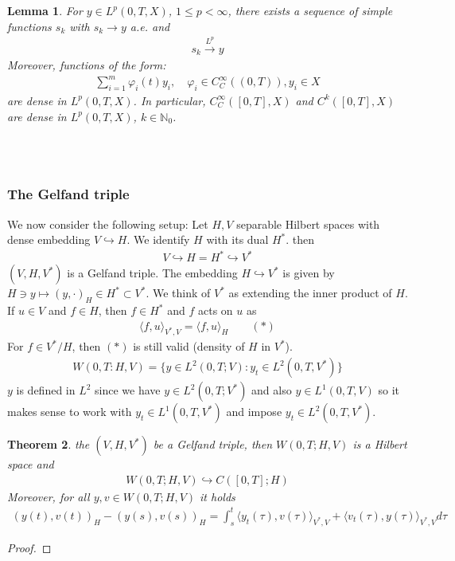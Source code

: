 \documentclass[a4paper,11pt,fleqn]{book}
\newtheorem{theorem}{Theorem}[section]
\newtheorem{lemma}[theorem]{Lemma}
\theoremstyle{definition}
\theoremstyle{remark}
\begin{document}
\begin{lemma}
	For $y \in L^p(0, T, X)$, $1 \le p < \infty$, there exists a sequence of simple functions $s_k$ with $s_k \rightarrow y$ a.e. and 
	\begin{align*}
		s_k \overset{L^p}{\rightarrow} y
	\end{align*}
	Moreover, functions of the form:
	\begin{align*}
		\sum_{i = 1}^m \varphi_i(t)y_i, \quad \varphi_i \in C_C^\infty((0, T)), y_i \in X
	\end{align*}
	are dense in $L^p(0, T, X)$. In particular, $C_C^\infty([0, T], X)$ and $C^k([0, T], X)$ are dense in $L^p(0, T, X)$, $k \in \mathbb{N}_0$. 
\end{lemma}
\quad\\
\quad\\
\subsubsection{The Gelfand triple}
We now consider the following setup: Let $H, V$ separable Hilbert spaces with dense embedding $V \hookrightarrow H$. We identify $H$ with its dual $H^*$. then
\begin{align*}
	V \hookrightarrow H = H^* \hookrightarrow V^*
\end{align*}
$(V, H, V^*)$ is a Gelfand triple. The embedding $H \hookrightarrow V^*$ is given by $H \ni y \mapsto (y, \cdot)_H \in H^* \subset V^*$. We think of $V^*$ as extending the inner product of $H$. If $u \in V$ and $f \in H$, then $f \in H^*$ and $f$ acts on $u$ as 
\begin{align*}
	\langle f, u \rangle_{V^*, V} = \langle f, u \rangle_H \qquad(*)
\end{align*}
For $f \in V^* \slash H$, then $(*)$ is still valid (density of $H$ in $V^*$).
\begin{align*}
	W(0, T: H, V) = \{ y \in L^2(0, T; V): y_t \in L^2(0, T, V^*)\}
\end{align*}
$y$ is defined in $L^2$ since we have $y \in L^2(0, T; V^*)$ and also $y \in L^1(0, T, V)$ so it makes sense to work with $y_t \in L^1(0, T, V^*)$ and impose $y_t \in L^2(0, T, V^*)$. 

\begin{theorem}
	the $(V, H, V^*)$ be a Gelfand triple, then $W(0, T; H, V)$ is a Hilbert space and 
	\begin{align*}
		W(0, T; H, V) \hookrightarrow C([0, T]; H)
	\end{align*}
	Moreover, for all $y, v \in W(0, T; H, V)$ it holds
	\begin{align*}
		(y(t), v(t))_H - (y(s), v(s))_H 
		= \int_s^t \langle y_t(\tau), v(\tau) \rangle_{V^*, V} + \langle v_t(\tau), y(\tau)\rangle_{V^*, V} d\tau
	\end{align*}
\end{theorem}
\begin{proof}
\end{proof}
\end{document}
